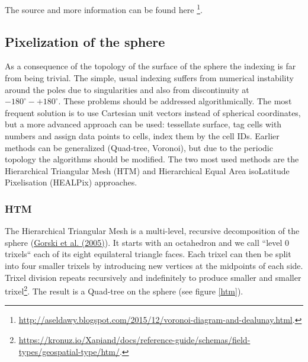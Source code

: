 \documentclass[12pt]{article}
\theoremstyle{plain}
\begin{document}
The source and more information can be found here \footnote{\url{http://aseldawy.blogspot.com/2015/12/voronoi-diagram-and-dealunay.html}.}.






\subsection{Pixelization of the sphere}

As a consequence of the topology of the surface of the sphere the indexing is far from being trivial. The simple, usual indexing suffers from numerical instability around the poles due to singularities and also from discontinuity at $- 180^\circ - + 180^\circ$. These problems should be addressed algorithmically. The most frequent solution is to use Cartesian unit vectors instead of spherical coordinates, but a more advanced approach can be used: tessellate surface, tag cells with numbers and assign data points to cells, index them by the cell IDs. Earlier methods can be generalized (Quad-tree, Voronoi), but due to the periodic topology the algorithms should be modified. The two most used methods are the Hierarchical Triangular Mesh (HTM) and Hierarchical Equal Area isoLatitude Pixelisation (HEALPix) approaches. 

\subsubsection{HTM}

The Hierarchical Triangular Mesh is a multi-level, recursive decomposition of the sphere (\hyperlink{Gorski et al. (2005)}{Gorski et al. (2005)}). It starts with an octahedron and we call “level 0 trixels“ each of its eight equilateral triangle faces. Each trixel can then be split into four smaller trixels by introducing new vertices at the midpoints of each side. Trixel division repeats recursively and indefinitely to produce smaller and smaller trixel\footnote{\url{https://kronuz.io/Xapiand/docs/reference-guide/schemas/field-types/geospatial-type/htm/}.}. The result is a Quad-tree on the sphere (see figure \ref{htm}).
\end{document}
